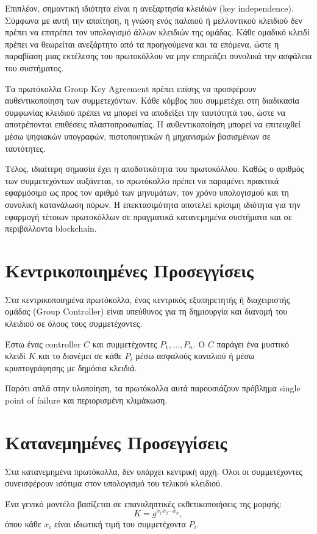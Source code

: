 \documentclass[12pt,a4paper]{report}
\begin{document}
Επιπλέον, σημαντική ιδιότητα είναι η ανεξαρτησία κλειδιών (key independence). Σύμφωνα με αυτή την απαίτηση, η γνώση ενός παλαιού ή μελλοντικού κλειδιού δεν πρέπει να επιτρέπει τον υπολογισμό άλλων κλειδιών της ομάδας. Κάθε ομαδικό κλειδί πρέπει να θεωρείται ανεξάρτητο από τα προηγούμενα και τα επόμενα, ώστε η παραβίαση μιας εκτέλεσης του πρωτοκόλλου να μην επηρεάζει συνολικά την ασφάλεια του συστήματος.

Τα πρωτόκολλα Group Key Agreement πρέπει επίσης να προσφέρουν αυθεντικοποίηση των συμμετεχόντων. Κάθε κόμβος που συμμετέχει στη διαδικασία συμφωνίας κλειδιού πρέπει να μπορεί να αποδείξει την ταυτότητά του, ώστε να αποτρέπονται επιθέσεις πλαστοπροσωπίας. Η αυθεντικοποίηση μπορεί να επιτευχθεί μέσω ψηφιακών υπογραφών, πιστοποιητικών ή μηχανισμών βασισμένων σε ταυτότητες.

Τέλος, ιδιαίτερη σημασία έχει η αποδοτικότητα του πρωτοκόλλου. Καθώς ο αριθμός των συμμετεχόντων αυξάνεται, το πρωτόκολλο πρέπει να παραμένει πρακτικά εφαρμόσιμο ως προς τον αριθμό των μηνυμάτων, τον χρόνο υπολογισμού και τη συνολική κατανάλωση πόρων. Η επεκτασιμότητα αποτελεί κρίσιμη ιδιότητα για την εφαρμογή τέτοιων πρωτοκόλλων σε πραγματικά κατανεμημένα συστήματα και σε περιβάλλοντα blockchain.

\section{Κεντρικοποιημένες Προσεγγίσεις}

Στα κεντρικοποιημένα πρωτόκολλα, ένας κεντρικός εξυπηρετητής ή διαχειριστής ομάδας (Group Controller) είναι υπεύθυνος για τη δημιουργία και διανομή του κλειδιού σε όλους τους συμμετέχοντες.

Έστω ένας controller $C$ και συμμετέχοντες $P_1, \dots, P_n$. Ο $C$ παράγει ένα μυστικό κλειδί $K$ και το διανέμει σε κάθε $P_i$ μέσω ασφαλούς καναλιού ή μέσω κρυπτογράφησης με δημόσια κλειδιά.

Παρότι απλά στην υλοποίηση, τα πρωτόκολλα αυτά παρουσιάζουν πρόβλημα single point of failure και περιορισμένη κλιμάκωση.

\section{Κατανεμημένες Προσεγγίσεις}

Στα κατανεμημένα πρωτόκολλα, δεν υπάρχει κεντρική αρχή. Όλοι οι συμμετέχοντες συνεισφέρουν ισότιμα στον υπολογισμό του τελικού κλειδιού.

Ένα γενικό μοντέλο βασίζεται σε επαναληπτικές εκθετικοποιήσεις της μορφής:
\[
K = g^{x_1 x_2 \cdots x_n},
\]
όπου κάθε $x_i$ είναι ιδιωτική τιμή του συμμετέχοντα $P_i$.
\end{document}
